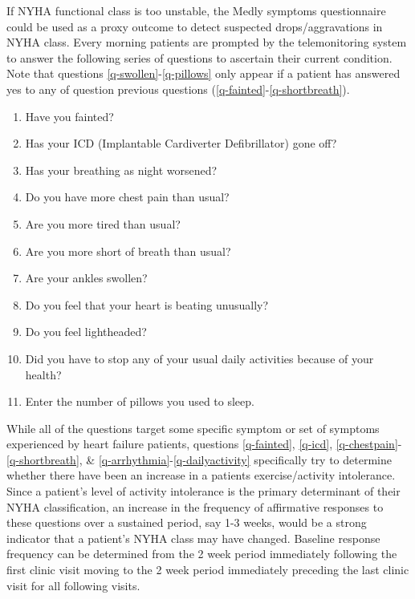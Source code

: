 \documentclass[]{article}
\begin{document}
If NYHA functional class is too unstable, the Medly symptoms questionnaire could be used as a proxy outcome to detect suspected drops/aggravations in NYHA class. Every morning patients are prompted by the telemonitoring system to answer the following series of questions to ascertain their current condition. Note that questions \ref{q-swollen}-\ref{q-pillows} only appear if a patient has answered yes to any of question previous questions (\ref{q-fainted}-\ref{q-shortbreath}).
\begin{enumerate}
	\item Have you fainted? \label{q-fainted}
	\item Has your ICD (Implantable Cardiverter Defibrillator) gone off? \label{q-icd}
	\item Has your breathing as night worsened? \label{q-worsebreath}
	\item Do you have more chest pain than usual? \label{q-chestpain}
	\item Are you more tired than usual? \label{q-tired}
	\item Are you more short of breath than usual? \label{q-shortbreath}
	\item Are your ankles swollen? \label{q-swollen}
	\item Do you feel that your heart is beating unusually? \label{q-arrhythmia}
	\item Do you feel lightheaded? \label{q-lightheaded}
	\item Did you have to stop any of your usual daily activities because of your health? \label{q-dailyactivity}
	\item Enter the number of pillows you used to sleep. \label{q-pillows}
\end{enumerate}

While all of the questions target some specific symptom or set of symptoms experienced by heart failure patients, questions \ref{q-fainted}, \ref{q-icd}, \ref{q-chestpain}-\ref{q-shortbreath}, \& \ref{q-arrhythmia}-\ref{q-dailyactivity} specifically try to determine whether there have been an increase in a patients exercise/activity intolerance. Since a patient's level of activity intolerance is the primary determinant of their NYHA classification, an increase in the frequency of affirmative responses to these questions over a sustained period, say 1-3 weeks, would be a strong indicator that a patient's NYHA class may have changed. Baseline response frequency can be determined from the 2 week period immediately following the first clinic visit moving to the 2 week period immediately preceding the last clinic visit for all following visits.
\end{document}

